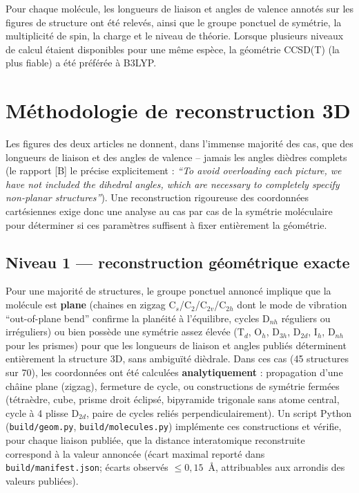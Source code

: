 \documentclass[11pt,a4paper]{article}
\begin{document}
Pour chaque mol\'ecule, les longueurs de liaison et angles de valence
annot\'es sur les figures de structure ont \'et\'e relev\'es, ainsi que le
groupe ponctuel de sym\'etrie, la multiplicit\'e de spin, la charge et le
niveau de th\'eorie. Lorsque plusieurs niveaux de calcul \'etaient
disponibles pour une m\^eme esp\`ece, la g\'eom\'etrie CCSD(T) (la plus
fiable) a \'et\'e pr\'ef\'er\'ee \`a B3LYP.

\section{M\'ethodologie de reconstruction 3D}

Les figures des deux articles ne donnent, dans l'immense majorit\'e des cas,
que des longueurs de liaison et des angles de valence -- jamais les angles
di\`edres complets (le rapport [B] le pr\'ecise explicitement : \emph{``To
avoid overloading each picture, we have not included the dihedral angles,
which are necessary to completely specify non-planar structures''}). Une
reconstruction rigoureuse des coordonn\'ees cart\'esiennes exige donc une
analyse au cas par cas de la sym\'etrie mol\'eculaire pour d\'eterminer si
ces param\`etres suffisent \`a fixer enti\`erement la g\'eom\'etrie.

\subsection{Niveau 1 --- reconstruction g\'eom\'etrique exacte}

Pour une majorit\'e de structures, le groupe ponctuel annonc\'e implique que
la mol\'ecule est \textbf{plane} (chaines en zigzag C$_s$/C$_2$/C$_{2v}$/C$_{2h}$
dont le mode de vibration ``out-of-plane bend'' confirme la plan\'eit\'e \`a
l'\'equilibre, cycles D$_{nh}$ r\'eguliers ou irr\'eguliers) ou bien
poss\`ede une sym\'etrie assez \'elev\'ee (T$_d$, O$_h$, D$_{3h}$, D$_{2d}$,
I$_h$, D$_{nh}$ pour les prismes) pour que les longueurs de liaison et
angles publi\'es d\'eterminent enti\`erement la structure 3D, sans ambigu\"it\'e
di\`edrale. Dans ces cas (45 structures sur 70), les coordonn\'ees ont
\'et\'e calcul\'ees \textbf{analytiquement} : propagation d'une châine plane
(zigzag), fermeture de cycle, ou constructions de sym\'etrie ferm\'ees
(t\'etra\`edre, cube, prisme droit \'eclips\'e, bipyramide trigonale sans
atome central, cycle \`a 4 plisse D$_{2d}$, paire de cycles reli\'es
perpendiculairement). Un script Python (\texttt{build/geom.py},
\texttt{build/molecules.py}) impl\'emente ces constructions et v\'erifie,
pour chaque liaison publi\'ee, que la distance interatomique reconstruite
correspond \`a la valeur annonc\'ee (\'ecart maximal report\'e dans
\texttt{build/manifest.json}; \'ecarts observ\'es $\le 0{,}15$~\AA,
attribuables aux arrondis des valeurs publi\'ees).
\end{document}
